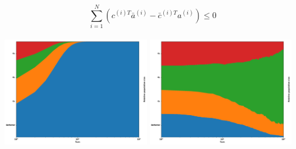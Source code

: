 \documentclass{beamer}
\begin{document}
\begin{frame}
    \begin{center}
    
    \end{center}
\end{frame}

\begin{frame}
    \begin{center}
        
    \end{center}
\end{frame}

\begin{frame}
    \begin{center}
    \[\sum_{i=1} ^ N (c^{(i)T} \bar{a}^{(i)} - \bar{c}^{(i)T} a^{(i)}) \leq 0\] \\ \vspace{.5cm}
    \pause
    \includegraphics[width=0.48\textwidth]{static/population_defection_takes_over.pdf}\hspace{6pt}
    \includegraphics[width=0.48\textwidth]{static/population_defection_fails.pdf}\vspace{10pt}

    \end{center}
\end{frame}


\begin{frame}
    \begin{center}
    
    \end{center}
\end{frame}
\end{document}
